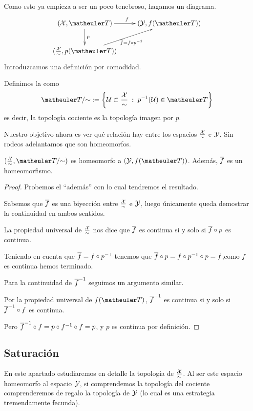 Como esto ya empieza a ser un poco tenebroso, hagamos un diagrama.
\begin{equation*}
	\xymatrix{
		(\X,\T) \ar[r]^f \ar[d]^p& (\Y,f(\T))\\
		(\frac{\X}{\sim},p(\T))\ar[ru]_{\adher{f}=f\circ p^{-1}} & \\
	}
\end{equation*}
Introduzcamos una definición por comodidad.
\begin{defi}
	Definimos la  como
	\[\T/\mathord{\sim} := \left\{\U\subset\frac{\X}{\sim} \midc p^{-1}(\U)\in\T\right\}\]
	es decir, la topología cociente es la topología imagen por $p$.
\end{defi}
Nuestro objetivo ahora es ver qué relación hay entre los espacios $\frac{\mathcal{X}}{\sim}$ e $\mathcal{Y}$. Sin rodeos adelantamos que son homeomorfos.
\begin{prop}
	$(\frac{\X}{\sim},\T/\mathord{\sim})$ es homeomorfo a $(\Y,f(\T))$. Además, $\overline{f}$ es un homeomorfismo.
\end{prop}
\begin{proof}
	Probemos el ``además'' con lo cual tendremos el resultado.
	
	Sabemos que $\overline{f}$ es una biyección entre $\frac{\mathcal{X}}{\sim}$ e $\mathcal{Y}$, luego únicamente queda demostrar la continuidad en ambos sentidos.
	
	La propiedad universal de $\frac{\mathcal{X}}{\sim}$ nos dice que $\overline{f}$ es continua si y solo si $\overline{f}\circ p$ es continua.
	
	Teniendo en cuenta que $\overline{f}=f\circ p^{-1}$ tenemos que $\overline{f}\circ p=f\circ p^{-1}\circ p=f$,como $f$ es continua hemos terminado.
	
	Para la continuidad de $\overline{f}^{-1}$ seguimos un argumento similar.
	
	Por la propiedad universal de $f(\T)$, $\overline{f}^{-1}$ es continua si y solo si $\overline{f}^{-1}\circ f$ es continua.
	
	Pero $\overline{f}^{-1}\circ f=p\circ f^{-1}\circ f=p$, y $p$ es continua por definición.
\end{proof}
\subsection{Saturación}
En este apartado estudiaremos en detalle la topología de $\frac{\mathcal{X}}{\sim}$. Al ser este espacio homeomorfo al espacio $\mathcal{Y}$, si comprendemos la topología del cociente comprenderemos de regalo la topología de $\mathcal{Y}$ (lo cual es una estrategia tremendamente fecunda).

